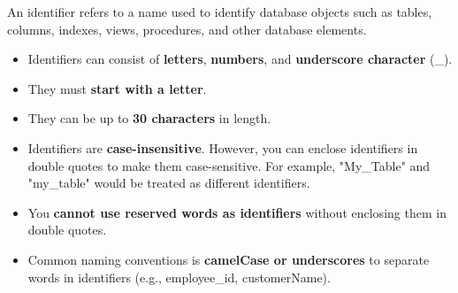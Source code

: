 \setlength{\columnsep}{3pt}
\begin{flushleft}

	An identifier refers to a name used to identify database objects such as tables, columns, indexes, views, procedures, and other database elements.

	\begin{itemize}
		\item Identifiers can consist of \textbf{letters}, \textbf{numbers}, and \textbf{underscore character} (\_).
		\item They must \textbf{start with a letter}.
		\item They can be up to \textbf{30 characters} in length.
		\item Identifiers are \textbf{case-insensitive}. However, you can enclose identifiers in double quotes to make them case-sensitive. For example, "My\_Table" and "my\_table" would be treated as different identifiers.
		\item You \textbf{cannot use reserved words as identifiers} without enclosing them in double quotes.
		\item Common naming conventions is \textbf{camelCase or underscores} to separate words in identifiers (e.g., employee\_id, customerName).
	\end{itemize}


		
\end{flushleft}

\newpage





